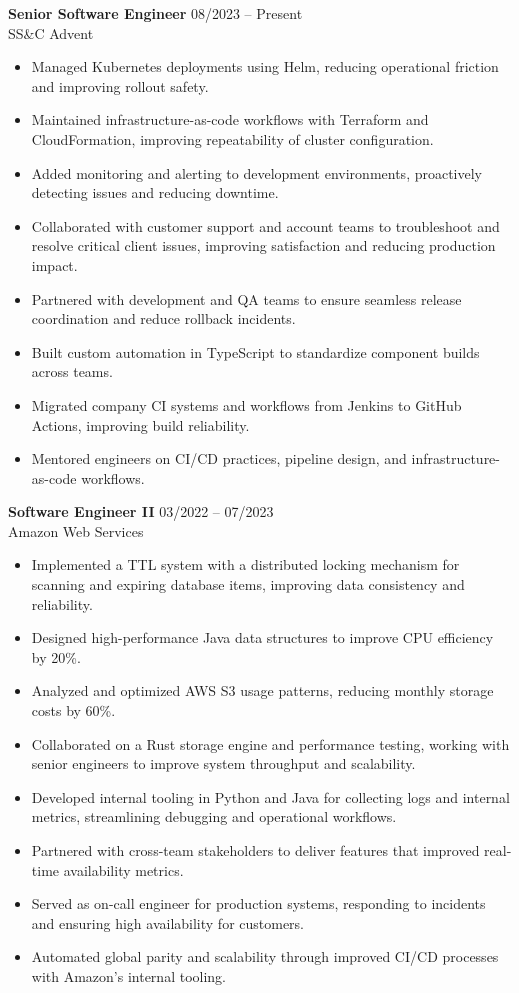 \documentclass[11pt]{article}
\begin{document}
    \noindent\textbf{Senior Software Engineer} \hfill 08/2023 -- Present \\
    SS\&C Advent
    \begin{itemize}
        \item Managed Kubernetes deployments using Helm, reducing operational friction and improving rollout safety.
        \item Maintained infrastructure-as-code workflows with Terraform and CloudFormation, improving repeatability of cluster configuration.
        \item Added monitoring and alerting to development environments, proactively detecting issues and reducing downtime.
        \item Collaborated with customer support and account teams to troubleshoot and resolve critical client issues, improving satisfaction and reducing production impact.
        \item Partnered with development and QA teams to ensure seamless release coordination and reduce rollback incidents.
        \item Built custom automation in TypeScript to standardize component builds across teams.
        \item Migrated company CI systems and workflows from Jenkins to GitHub Actions, improving build reliability.
        \item Mentored engineers on CI/CD practices, pipeline design, and infrastructure-as-code workflows.
    \end{itemize}

    \noindent\textbf{Software Engineer II} \hfill 03/2022 -- 07/2023 \\
    Amazon Web Services
    \begin{itemize}
        \item Implemented a TTL system with a distributed locking mechanism for scanning and expiring database items, improving data consistency and reliability.
        \item Designed high-performance Java data structures to improve CPU efficiency by 20\%.
        \item Analyzed and optimized AWS S3 usage patterns, reducing monthly storage costs by 60\%.
        \item Collaborated on a Rust storage engine and performance testing, working with senior engineers to improve system throughput and scalability.
        \item Developed internal tooling in Python and Java for collecting logs and internal metrics, streamlining debugging and operational workflows.
        \item Partnered with cross-team stakeholders to deliver features that improved real-time availability metrics.
        \item Served as on-call engineer for production systems, responding to incidents and ensuring high availability for customers.
        \item Automated global parity and scalability through improved CI/CD processes with Amazon's internal tooling.
    \end{itemize}
\end{document}
